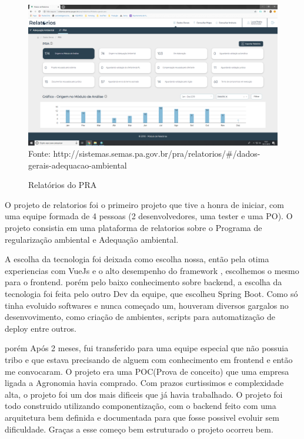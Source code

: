 \begin{figure}[H]
\centering
\caption{Relatórios do PRA} %
\includegraphics[scale=0.22]{relatorios-pra}\\  %
{\small Fonte: http://sistemas.semas.pa.gov.br/pra/relatorios/#/dados-gerais-adequacao-ambiental} %
\label{fig:exemplo} %
\end{figure}

O projeto de relatorios foi o primeiro projeto que tive a honra de iniciar, com uma equipe formada de 4 pessoas (2 desenvolvedores, uma tester e uma PO).
O projeto consistia em uma plataforma de relatorios sobre o Programa de regularização ambiental e Adequação ambiental.

A escolha da tecnologia foi deixada como escolha nossa, então pela otima experiencias com VueJs e o alto desempenho do framework , escolhemos o mesmo para o frontend.
porém pelo baixo conhecimento sobre backend, a escolha da tecnologia foi feita pelo outro Dev da equipe, que escolheu Spring Boot.
Como só tinha evoluido softwares e nunca começado um, houveram diversos gargalos no desenvovimento, como criação de ambientes, scripts para automatização de deploy entre outros.

porém Após 2 meses, fui transferido para uma equipe especial que não possuia tribo e que estava precisando de alguem com conhecimento em frontend e então me convocaram.
O projeto era uma POC(Prova de conceito) que uma empresa ligada a Agronomia havia comprado. Com prazos curtissimos e complexidade alta, o projeto foi um dos mais dificeis que já havia trabalhado.
O projeto foi todo construido utilizando componentização, com o backend feito com uma arquitetura bem definida e documentada para que fosse possivel evoluir sem dificuldade. Graças a esse começo bem estruturado o projeto ocorreu bem.

